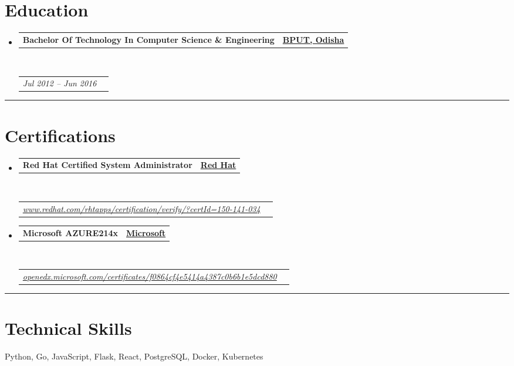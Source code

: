 \documentclass[10pt,a4paper,hidelinks]{article}
\makeatletter
\newenvironment{indentsection}[1]%
{\begin{list}{}%
	{\setlength{\leftmargin}{#1}}%
	\item[]%
}
{\end{list}}
\newcommand{\headerrow}[2]
{\begin{tabular*}{\linewidth}{l@{\extracolsep{\fill}}r}
	#1 &
	#2 \\
\end{tabular*}}
\makeatother
\begin{document}
\section*{Education}

\begin{itemize}
	\parskip=0.1em

	\item 
	\headerrow
		{\textbf{Bachelor Of Technology In Computer Science \& Engineering}}
		{{\href{http://www.bput.ac.in/}{\textbf{BPUT, Odisha}}}}
	\\
	\headerrow
		{\emph{Jul 2012 -- Jun 2016}}
		{\emph{}}

\end{itemize}


\hrule
\vspace{-0.3em}
\section*{Certifications}

\begin{itemize}
	\parskip=0.1em

	\item 
	\headerrow
		{\textbf{Red Hat Certified System Administrator}}
		{{\href{https://www.redhat.com/}{\textbf{Red Hat}}}}
	\\
	\headerrow
	    {\emph{\href{https://www.redhat.com/rhtapps/certification/verify/?certId=150-141-034}{www.redhat.com/rhtapps/certification/verify/?certId=150-141-034}}}
		{\emph{}}
	
	\item 
	\headerrow
		{\textbf{Microsoft AZURE214x}}
		{{\href{https://www.microsoft.com/}{\textbf{Microsoft}}}}
	\\
	\headerrow
	    {\emph{\href{https://openedx.microsoft.com/certificates/f0864cf4e5414a4387c0b6b1e5dcd880}{openedx.microsoft.com/certificates/f0864cf4e5414a4387c0b6b1e5dcd880}}}
		{\emph{}}

\end{itemize}


\hrule
\vspace{-0.3em}
\section*{Technical Skills}

\begin{indentsection}{\parindent}
\begin{description*}
    Python, Go, JavaScript, Flask, React, PostgreSQL, Docker, Kubernetes
\end{description*}
\end{indentsection}
\end{document}
